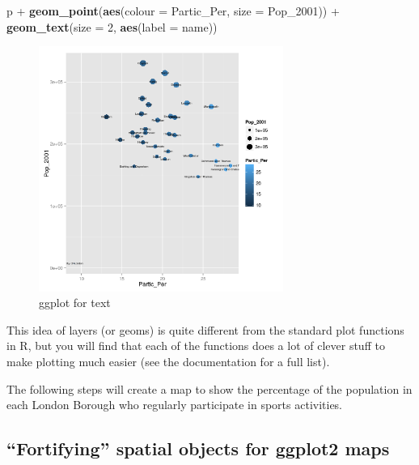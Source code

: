 \documentclass[]{article}
\newenvironment{Shaded}{}{}
\newcommand{\KeywordTok}[1]{\textcolor[rgb]{0.00,0.44,0.13}{\textbf{{#1}}}}
\newcommand{\DataTypeTok}[1]{\textcolor[rgb]{0.56,0.13,0.00}{{#1}}}
\newcommand{\DecValTok}[1]{\textcolor[rgb]{0.25,0.63,0.44}{{#1}}}
\newcommand{\NormalTok}[1]{{#1}}
\let\Oldincludegraphics\includegraphics
\renewcommand{\includegraphics}[1]{\Oldincludegraphics[width=8cm]{#1}}
\begin{document}
\begin{Shaded}
\begin{Highlighting}[]
\NormalTok{p + }\KeywordTok{geom_point}\NormalTok{(}\KeywordTok{aes}\NormalTok{(}\DataTypeTok{colour =} \NormalTok{Partic_Per, }\DataTypeTok{size =} \NormalTok{Pop_2001)) + }\KeywordTok{geom_text}\NormalTok{(}\DataTypeTok{size =} \DecValTok{2}\NormalTok{, }
    \KeywordTok{aes}\NormalTok{(}\DataTypeTok{label =} \NormalTok{name))}
\end{Highlighting}
\end{Shaded}
\begin{figure}[htbp]
\centering
\includegraphics{figure/ggplot_for_text.png}
\caption{ggplot for text}
\end{figure}

This idea of layers (or geoms) is quite different from the standard plot
functions in R, but you will find that each of the functions does a lot
of clever stuff to make plotting much easier (see the documentation for
a full list).

The following steps will create a map to show the percentage of the
population in each London Borough who regularly participate in sports
activities.

\subsection{``Fortifying'' spatial objects for ggplot2 maps}
\end{document}
